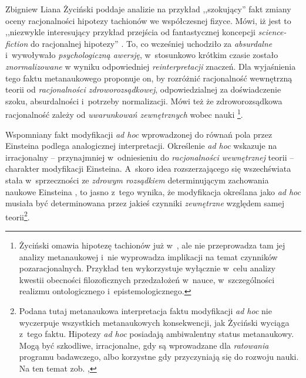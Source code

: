 \begin{artplenv}{Zbigniew Liana}
Życiński poddaje analizie na przykład ,,szokujący'' fakt zmiany oceny racjonalności hipotezy tachionów we współczesnej
fizyce. Mówi, iż jest to ,,niezwykle interesujący przykład przejścia od fantastycznej koncepcji \textit{science-fiction}
do racjonalnej hipotezy''
\parencites[s.~129]{zycinski_structure_1988}[s.~228]{zycinski_struktura_2013}.
To, co wcześniej
uchodziło za \textit{absurdalne} i~wywoływało \textit{psychologiczną awersję}, w~stosunkowo krótkim czasie zostało
\textit{znormalizowane }w wyniku odpowiedniej \textit{reinterpretacji} znaczeń. Dla wyjaśnienia tego faktu metanaukowego
proponuje on, by rozróżnić racjonalność wewnętrzną teorii od \textit{racjonalności zdroworozsądkowej}, odpowiedzialnej za
doświadczenie szoku, absurdalności i~potrzeby normalizacji. Mówi też że zdroworozsądkowa racjonalność zależy od
\textit{uwarunkowań zewnętrznych} wobec nauki
\parencites[s.~130]{zycinski_structure_1988}[s.~229n]{zycinski_struktura_2013}\footnote{Życiński omawia hipotezę tachionów już w~\parencite*[s.~175–176]{zycinski_teizm_1985},
ale nie przeprowadza tam jej analizy metanaukowej i~nie wyprowadza implikacji na temat czynników
pozaracjonalnych. Przykład ten wykorzystuje wyłącznie w~celu analizy kwestii obecności filozoficznych
przedzałożeń w~nauce, w~szczególności realizmu ontologicznego i~epistemologicznego.}.

Wspomniany fakt modyfikacji \textit{ad hoc} wprowadzonej do równań pola przez Einsteina
\parencite[zob.][s.~189]{zycinski_elementy_1996}
podlega analogicznej interpretacji. Określenie \textit{ad hoc} wskazuje na irracjonalny --
przynajmniej w~odniesieniu do \textit{racjonalności wewnętrznej} teorii -- charakter modyfikacji Einsteina. A~skoro idea
rozszerzającego się wszechświata stała w~sprzeczności ze \textit{zdrowym rozsądkiem} determinującym zachowania naukowe
Einsteina
\parencite[s.~249]{zycinski_jezyk_1983},
to jasno z~tego wynika, że modyfikacja określana
jako \textit{ad hoc} musiała być determinowana przez jakieś czynniki \textit{zewnętrzne} względem samej
teorii\footnote{Podana tutaj metanaukowa interpretacja faktu modyfikacji \textit{ad hoc} nie wyczerpuje wszystkich
metanaukowych konsekwencji, jak Życiński wyciąga z~tego faktu. Hipotezy \textit{ad hoc} posiadają ambiwalentny status
metanaukowy. Mogą być szkodliwe, irracjonalne, gdy są wprowadzane dla \textit{ratowania} programu badawczego, albo
korzystne gdy przyczyniają się do rozwoju nauki. Na ten temat zob.
\parencite[s.~162n]{zycinski_jezyk_1983},
}.


\end{artplenv}

